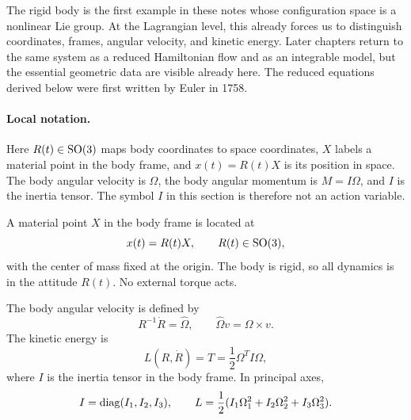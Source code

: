 The rigid body is the first example in these notes whose configuration space is
a nonlinear Lie group. At the Lagrangian level, this already forces us to
distinguish coordinates, frames, angular velocity, and kinetic energy. Later
chapters return to the same system as a reduced Hamiltonian flow and as an
integrable model, but the essential geometric data are visible already here.
The reduced equations derived below were first written by Euler in 1758.

\paragraph{Local notation.}
Here \(R(t)\in\operatorname{SO}(3)\) maps body coordinates to space coordinates, \(X\) labels
a material point in the body frame, and \(x(t)=R(t)X\) is its position in
space.  The body angular velocity is \(\Omega\), the body angular momentum is
\(M=I\Omega\), and \(I\) is the inertia tensor.  The symbol \(I\) in this
section is therefore not an action variable.

\begin{assumption}
A material point \(X\) in the body frame is located at
\[
  x(t)=R(t)X,
  \qquad R(t)\in\operatorname{SO}(3),
\]
with the center of mass fixed at the origin. The body is rigid, so all dynamics
is in the attitude \(R(t)\). No external torque acts.
\end{assumption}

The body angular velocity is defined by
\[
  R^{-1}\dot R=\widehat\Omega,
  \qquad
  \widehat\Omega v=\Omega\times v.
\]
The kinetic energy is
\[
  L(R,\dot R)=T
  =
  \frac12\Omega^TI\Omega,
\]
where \(I\) is the inertia tensor in the body frame. In principal axes,
\[
  I=\operatorname{diag}(I_1,I_2,I_3),
  \qquad
  L=\frac12(I_1\Omega_1^2+I_2\Omega_2^2+I_3\Omega_3^2).
\]

